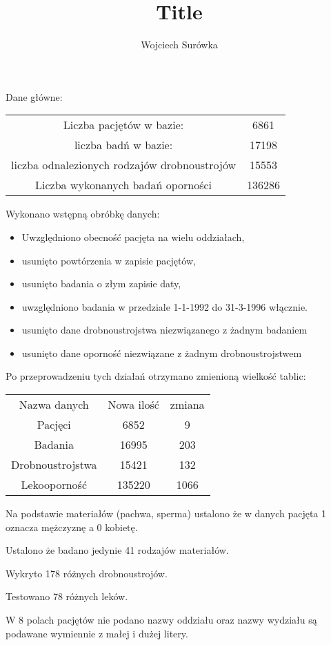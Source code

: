 \documentclass[a4paper,12pt]{article}
\title{Title}
\author{Wojciech Surówka}
\begin{document}
Dane główne:
\begin{table}[h]
\begin{center}
\begin{tabular}{cc}
\hline
Liczba pacjętów w bazie: & 6861 \\
liczba badń w bazie: & 17198 \\
liczba odnalezionych rodzajów drobnoustrojów & 15553 \\
Liczba wykonanych badań oporności & 136286  \\
\hline
\end{tabular}
\end{center}
\end{table}

Wykonano wstępną obróbkę danych:
\begin{itemize}
  \item Uwzględniono obecność pacjęta na wielu oddziałach,
  \item usunięto powtórzenia w zapisie pacjętów,
  \item usunięto badania o złym zapisie daty,
  \item uwzględniono badania w przedziale 1-1-1992 do 31-3-1996 włącznie.
  \item usunięto dane drobnoustrojstwa niezwiązanego z żadnym badaniem
  \item usunięto dane oporność niezwiązane z żadnym drobnoustrojstwem
\end{itemize}
Po przeprowadzeniu tych działań otrzymano zmienioną wielkość tablic:
\begin{table}[h]
\begin{center}
\begin{tabular}{c|c|c}
\hline
Nazwa danych & Nowa ilość & zmiana \\
Pacjęci & 6852 & 9 \\
Badania & 16995  & 203\\
Drobnoustrojstwa & 15421 & 132\\
Lekooporność & 135220 & 1066 \\
\hline
\end{tabular}
\end{center}
\end{table}

Na podstawie materiałów (pachwa, sperma) ustalono że w danych pacjęta 1 oznacza mężczyznę a 0 kobietę.

Ustalono że badano jedynie 41 rodzajów materiałów.

Wykryto 178 różnych drobnoustrojów.

Testowano 78 różnych leków.

W 8 polach pacjętów nie podano nazwy oddziału oraz nazwy wydziału są podawane wymiennie z małej i dużej litery.
\end{document}
